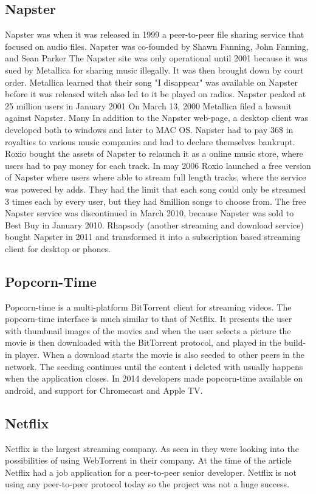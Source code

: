 \subsection{Napster}
Napster was when it was released in 1999 a peer-to-peer file sharing service that focused on audio files. Napster was co-founded by Shawn Fanning, John Fanning, and Sean Parker The Napster site was only operational until 2001 because it was sued by Metallica for sharing music illegally. It was then brought down by court order. Metallica learned that their song "I disappear" was available on Napster before it was released witch also led to it be played on radios. Napster peaked at 25 million users in January 2001 On March 13, 2000 Metallica filed a lawsuit against Napster. Many  In addition to the Napster web-page, a desktop client was developed both to windows and later to MAC OS.
Napster had to pay 36\$ in royalties to various music companies and had to declare themselves bankrupt. Roxio bought the assets of Napster to relaunch it as a online music store, where users had to pay money for each track. In may 2006 Roxio launched a free version of Napster where users where able to stream full length tracks, where the service was powered by adds. They had the limit that each song could only be streamed 3 times each by every user, but they had 8million songs to choose from.
The free Napster service was discontinued in March 2010, because Napster was sold to Best Buy in January 2010.
Rhapsody (another streaming and download service) bought Napster in 2011 and transformed it into a subscription based streaming client for desktop or phones.

\subsection{Popcorn-Time}
Popcorn-time is a multi-platform BitTorrent client for streaming videos. The popcorn-time interface is much similar to that of Netflix. It presents the user with thumbnail images of the movies and when the user selects a picture the movie is then downloaded with the BitTorrent protocol, and played in the build-in player.
 When a download starts the movie is also seeded to other peers in the network. The seeding continues until the content i deleted with usually happens when the application closes.
 In 2014 developers made popcorn-time available on android, and support for Chromecast and Apple TV.

\subsection{Netflix}
Netflix is the largest streaming company. As seen in \citep{netflix} they were looking into the possibilities of using WebTorrent in their company. At the time of the article Netflix had a job application for a peer-to-peer senior developer. Netflix is not using any peer-to-peer protocol today so the project was not a huge success.

